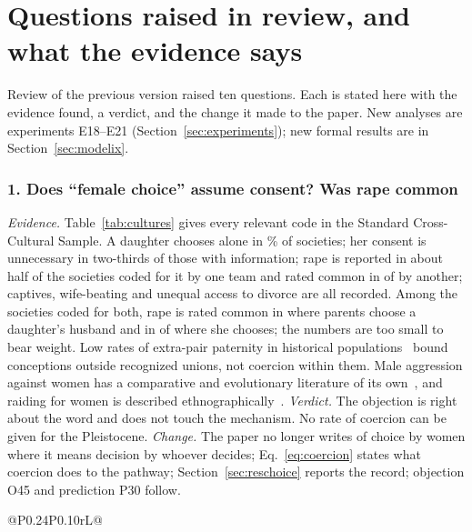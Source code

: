 \section{Questions raised in review, and what the evidence says}\label{sec:notes}

Review of the previous version raised ten questions. Each is stated here with the evidence found, a verdict, and the
change it made to the paper. New analyses are experiments E18--E21 (Section~\ref{sec:experiments}); new formal results are
in Section~\ref{sec:modelix}.

\subsubsection{1. Does ``female choice'' assume consent? Was rape common}
\emph{Evidence.} Table~\ref{tab:cultures} gives every relevant code in the Standard Cross-Cultural Sample. A daughter
chooses alone in \CcAloneW\% of societies; her consent is unnecessary in two-thirds of those with information; rape is
reported in about half of the societies coded for it by one team and rated common in \CcRapeCom{} of \CcRapeN{} by another;
captives, wife-beating and unequal access to divorce are all recorded. Among the \CcRapeParN{} societies coded for both,
rape is rated common in \CcRapeParCom{} where parents choose a daughter's husband and in \CcRapeOwnCom{} of \CcRapeOwnN{}
where she chooses; the numbers are too small to bear weight. Low rates of extra-pair paternity in historical
populations~\cite{larmuseau2016} bound conceptions outside recognized unions, not coercion within them. Male aggression
against women has a comparative and evolutionary literature of its own~\cite{smuts1992}, and raiding for women is described
ethnographically~\cite{chagnon1988}. \emph{Verdict.} The objection is right about the word and does not touch the
mechanism. No rate of coercion can be given for the Pleistocene. \emph{Change.} The paper no longer writes of choice by
women where it means decision by whoever decides; Eq.~\eqref{eq:coercion} states what coercion does to the pathway;
Section~\ref{sec:reschoice} reports the record; objection O45 and prediction P30 follow.

\begin{table}[t]
\caption{Who decides a marriage, and how much constraint and coercion is coded, in the Standard Cross-Cultural Sample and in
Binford's hunter-gatherer compilation (D-PLACE release~\cite{kirby2016}). Counts and shares of societies with a code; no
significance is claimed across societies, which share ancestry and neighbors.}\label{tab:cultures}
\scriptsize
\begin{tabularx}{\textwidth}{@{}P{0.24\textwidth}P{0.10\textwidth}rL@{}}
\toprule
{}
\bottomrule
\end{tabularx}
\end{table}

